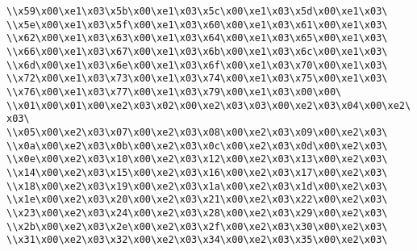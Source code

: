 \verb|\\x59\x00\xe1\x03\x5b\x00\xe1\x03\x5c\x00\xe1\x03\x5d\x00\xe1\x03\|\newline
\verb|\\x5e\x00\xe1\x03\x5f\x00\xe1\x03\x60\x00\xe1\x03\x61\x00\xe1\x03\|\newline
\verb|\\x62\x00\xe1\x03\x63\x00\xe1\x03\x64\x00\xe1\x03\x65\x00\xe1\x03\|\newline
\verb|\\x66\x00\xe1\x03\x67\x00\xe1\x03\x6b\x00\xe1\x03\x6c\x00\xe1\x03\|\newline
\verb|\\x6d\x00\xe1\x03\x6e\x00\xe1\x03\x6f\x00\xe1\x03\x70\x00\xe1\x03\|\newline
\verb|\\x72\x00\xe1\x03\x73\x00\xe1\x03\x74\x00\xe1\x03\x75\x00\xe1\x03\|\newline
\verb|\\x76\x00\xe1\x03\x77\x00\xe1\x03\x79\x00\xe1\x03\x00\x00\|\newline
\verb|\\x01\x00\x01\x00\xe2\x03\x02\x00\xe2\x03\x03\x00\xe2\x03\x04\x00\xe2\x03\|\newline
\verb|\\x05\x00\xe2\x03\x07\x00\xe2\x03\x08\x00\xe2\x03\x09\x00\xe2\x03\|\newline
\verb|\\x0a\x00\xe2\x03\x0b\x00\xe2\x03\x0c\x00\xe2\x03\x0d\x00\xe2\x03\|\newline
\verb|\\x0e\x00\xe2\x03\x10\x00\xe2\x03\x12\x00\xe2\x03\x13\x00\xe2\x03\|\newline
\verb|\\x14\x00\xe2\x03\x15\x00\xe2\x03\x16\x00\xe2\x03\x17\x00\xe2\x03\|\newline
\verb|\\x18\x00\xe2\x03\x19\x00\xe2\x03\x1a\x00\xe2\x03\x1d\x00\xe2\x03\|\newline
\verb|\\x1e\x00\xe2\x03\x20\x00\xe2\x03\x21\x00\xe2\x03\x22\x00\xe2\x03\|\newline
\verb|\\x23\x00\xe2\x03\x24\x00\xe2\x03\x28\x00\xe2\x03\x29\x00\xe2\x03\|\newline
\verb|\\x2b\x00\xe2\x03\x2e\x00\xe2\x03\x2f\x00\xe2\x03\x30\x00\xe2\x03\|\newline
\verb|\\x31\x00\xe2\x03\x32\x00\xe2\x03\x34\x00\xe2\x03\x35\x00\xe2\x03\|\newline
